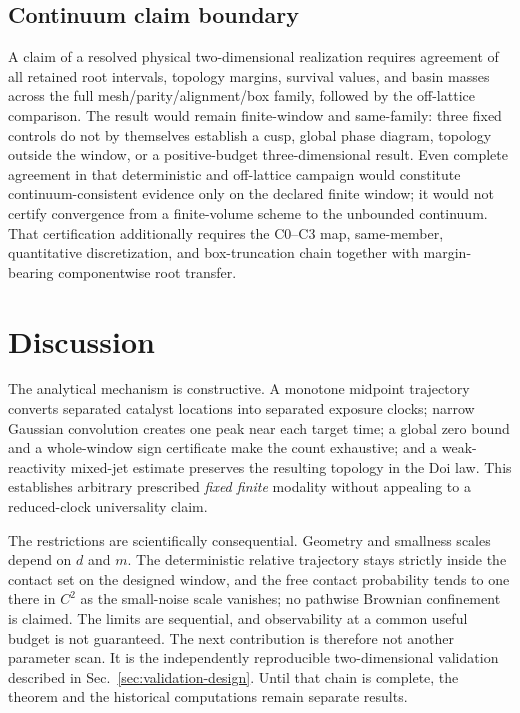 \documentclass[aps,physrev,reprint,amsmath,amssymb,longbibliography,floatfix]{revtex4-2}
\begin{document}
\subsection{Continuum claim boundary}

A claim of a resolved physical two-dimensional realization requires agreement
of all retained root intervals, topology margins, survival values, and basin
masses across the full mesh/parity/alignment/box family, followed by the
off-lattice comparison.  The result would remain finite-window and
same-family: three fixed controls do not by themselves establish a cusp,
global phase diagram, topology outside the window, or a positive-budget
three-dimensional result.
Even complete agreement in that deterministic and off-lattice campaign would
constitute continuum-consistent evidence only on the declared finite window;
it would not certify convergence from a finite-volume scheme to the unbounded
continuum.  That certification additionally requires the C0--C3 map,
same-member, quantitative discretization, and box-truncation chain together
with margin-bearing componentwise root transfer.

\section{Discussion}
\label{sec:discussion}

The analytical mechanism is constructive.  A monotone midpoint trajectory
converts separated catalyst locations into separated exposure clocks; narrow
Gaussian convolution creates one peak near each target time; a global zero
bound and a whole-window sign certificate make the count exhaustive; and a
weak-reactivity mixed-jet estimate preserves the resulting topology in the Doi
law.  This establishes arbitrary prescribed \emph{fixed finite} modality
without appealing to a reduced-clock universality claim.

The restrictions are scientifically consequential.  Geometry and smallness
scales depend on $d$ and $m$.  The deterministic relative trajectory stays
strictly inside the contact set on the designed window, and the free contact
probability tends to one there in $C^2$ as the small-noise scale vanishes; no
pathwise Brownian confinement is claimed.  The limits are sequential, and
observability at a common useful budget is not guaranteed.  The next
contribution is therefore not another parameter scan.
It is the independently reproducible two-dimensional validation described in
Sec.~\ref{sec:validation-design}.  Until that chain is complete, the theorem
and the historical computations remain separate results.


\end{document}
